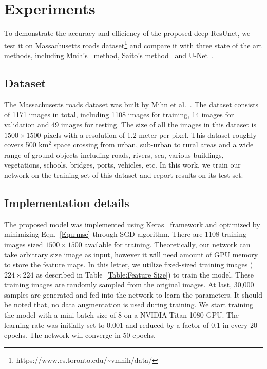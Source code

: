 \documentclass[journal]{IEEEtran}
\begin{document}
\vspace{-0.2cm}
\section{Experiments}
\label{sec:experiment}

To demonstrate the accuracy and efficiency of the proposed deep ResUnet, we test it on Massachusetts roads dataset\footnote{https://www.cs.toronto.edu/\~{}vmnih/data/} and compare it with three state of the art methods, including Mnih's~\cite{mnih2010learning} method, Saito's method~\cite{Saito2016Multiple} and U-Net~\cite{U-NET2015}. 

\vspace{-0.2cm}
\subsection{Dataset}
The Massachusetts roads dataset was built by Mihn et al.~\cite{mnih2010learning}. The dataset consists of 1171 images in total, including 1108 images for training, 14 images for validation and 49 images for testing. The size of all the images in this dataset is $1500\times1500$ pixels with a resolution of 1.2 meter per pixel. This dataset roughly covers 500 km$^2$ space crossing from urban, sub-urban to rural areas and a wide range of ground objects including roads, rivers, sea, various buildings, vegetations, schools, bridges, ports, vehicles, etc. In this work, we train our network on the training set of this dataset and report results on its test set.


\subsection{Implementation details}
The proposed model was implemented using Keras~\cite{chollet2015keras} framework and optimized by minimizing Eqn.~\ref{Equ:mse} through SGD algorithm. There are 1108 training images sized $1500\times1500$ available for training. Theoretically, our network can take arbitrary size image as input, however it will need amount of GPU memory to store the feature maps. In this letter, we utilize fixed-sized training images ($224\times224$ as described in Table~\ref{Table:Feature Size}) to train the model. These training images are randomly sampled from the original images. At last, 30,000 samples are generated and fed into the network to learn the parameters. It should be noted that, no data augmentation is used during training. We start training the model with a mini-batch size of 8 on a NVIDIA Titan 1080 GPU. The learning rate was initially set to 0.001 and reduced by a factor of 0.1 in every 20 epochs. The network will converge in 50 epochs. 
\end{document}
